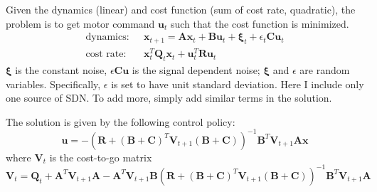Given the dynamics (linear) and cost function (sum of cost rate, quadratic), the problem is to get motor command $\bm{u}_t$ such that the cost function is minimized.
\begin{equation}\label{optimprob}
\begin{split}
\text{dynamics:~~} & \bm{x}_{t+1} = \bm{Ax}_t + \bm{Bu}_t + \bm{\xi}_t + \epsilon_t\bm{Cu}_t \\
\text{cost rate:~~} & \bm{x}_t^T\bm{Q}_t\bm{x}_t + \bm{u}_t^T\bm{Ru}_t
\end{split}
\end{equation}
$\bm{\xi}$ is the constant noise, $\epsilon\bm{Cu}$ is the signal dependent noise; $\bm{\xi}$ and $\epsilon$ are random variables. Specifically, $\epsilon$ is set to have unit standard deviation. Here I include only one source of SDN. To add more, simply add similar terms in the solution.

The solution is given by the following control policy:
\begin{equation}
\bm{u} = -(\bm{R}+(\bm{B+C})^T\bm{V}_{t+1}(\bm{B+C}) )^{-1} \bm{B}^T\bm{V}_{t+1}\bm{Ax}
\end{equation}
where $\bm{V}_t$ is the cost-to-go matrix 
\begin{equation}
\bm{V}_t = \bm{Q}_t + \bm{A}^T\bm{V}_{t+1}\bm{A} - \bm{A}^T\bm{V}_{t+1}\bm{B}(\bm{R} + (\bm{B+C})^T\bm{V}_{t+1}(\bm{B+C}))^{-1}\bm{B}^T\bm{V}_{t+1}\bm{A}
\end{equation}

